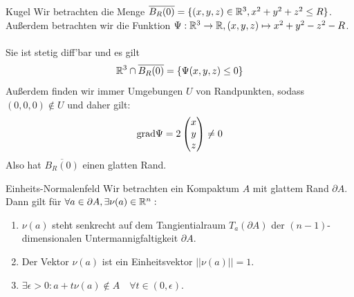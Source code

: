 \begin{Beispiel}{Kugel}
    Wir betrachten die Menge $\overline{B_R(0)}=\{(x,y,z)\in\mathbb{R}^3, x^2+y^2+z^2\leq R\}$. Außerdem betrachten wir die Funktion $\Psi: \mathbb{R}^3\rightarrow \mathbb{R}, (x,y,z)\mapsto x^2+y^2-z^2-R$. \\ \\
    Sie ist stetig diff'bar und es gilt $$\mathbb{R}^3\cap \overline{B_R(0)}=\{\Psi(x,y,z)\leq 0\}$$
    Außerdem finden wir immer Umgebungen $U$ von Randpunkten, sodass $(0,0,0)\notin U$ und daher gilt:
    $$\text{grad} \Psi=2\begin{pmatrix}
        x \\ y \\ z
    \end{pmatrix}\neq 0$$
    Also hat $\overline{B_R(0)}$ einen glatten Rand.
\end{Beispiel}
\begin{Def}{Einheits-Normalenfeld}
    Wir betrachten ein Kompaktum $A$ mit glattem Rand $\partial A$. Dann gilt für $\forall a \in \partial A, \exists\nu(a)\in \mathbb{R}^n:$
    \begin{enumerate}
        \item $\nu(a)$ steht senkrecht auf dem Tangientialraum $T_a(\partial A)$ der $(n-1)$-dimensionalen Untermannigfaltigkeit $\partial A$.
        \item Der Vektor $\nu(a)$ ist ein Einheitsvektor $||\nu(a)||=1$.
        \item $\exists \epsilon >0: a+t\nu(a)\notin A \quad \forall t\in (0,\epsilon)$.
    \end{enumerate}
\end{Def}
\newpage
